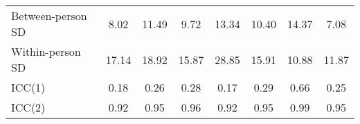 \begin{tabular}[t]{lccccccc}
\hspace{1em}Between-person SD & 8.02 & 11.49 & 9.72 & 13.34 & 10.40 & 14.37 & 7.08\\
\hspace{1em}Within-person SD & 17.14 & 18.92 & 15.87 & 28.85 & 15.91 & 10.88 & 11.87\\
\hspace{1em}ICC(1) & 0.18 & 0.26 & 0.28 & 0.17 & 0.29 & 0.66 & 0.25\\
\hspace{1em}ICC(2) & 0.92 & 0.95 & 0.96 & 0.92 & 0.95 & 0.99 & 0.95\\
\bottomrule
\end{tabular}
